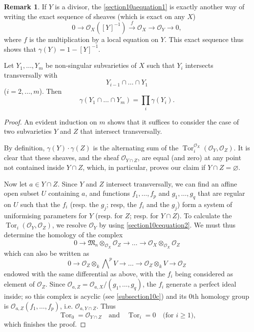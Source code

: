 \documentclass{article}
\theoremstyle{plain}
\newenvironment{proposition}[1]
    {\renewcommand\theinnercustomproposition{#1}\innercustomproposition}
    {\endinnercustomproposition}
\theoremstyle{definition}
\newtheorem*{remark}{Remark}
\newcommand{\sh}[1]{{\mathscr{#1}}}
\renewcommand{\geq}{\geqslant}
\DeclareMathOperator{\Tor}{Tor}
\begin{document}
\begin{remark}
  If $Y$ is a divisor, the \cref{section10aequation1} is exactly another way of writing the exact sequence of sheaves (which is exact on any $X$)
  \[
  \label{equation3}
    0 \to \sh{O}_X([Y]^{-1}) \xrightarrow{f} \sh{O}_X \to \sh{O}_Y \to 0,
    \tag{3}
  \]
  where $f$ is the multiplication by a local equation on $Y$.
  This exact sequence thus shows that $\gamma(Y)=1-[Y]^{-1}$.
\end{remark}

\begin{proposition}{11}
\label{proposition11}
  Let $Y_1,\ldots,Y_m$ be non-singular subvarieties of $X$ such that $Y_i$ intersects transversally with
  \[
    Y_{i-1} \cap\ldots\cap Y_1
  \]
  ($i=2,\ldots,m$).
  Then
  \[
    \gamma(Y_1\cap\ldots\cap Y_m) = \prod_i\gamma(Y_i).
  \]
\end{proposition}

\begin{proof}
  An evident induction on $m$ shows that it suffices to consider the case of two subvarieties $Y$ and $Z$ that intersect transversally.

  By definition, $\gamma(Y)\cdot\gamma(Z)$ is the alternating sum of the $\Tor_i^{\sh{O}_X}(\sh{O}_Y,\sh{O}_Z)$.
  It is clear that these sheaves, and the sheaf $\sh{O}_{Y\cap Z}$, are equal (and zero) at any point not contained inside $Y\cap Z$, which, in particular, proves our claim if $Y\cap Z=\varnothing$.

  Now let $a\in Y\cap Z$.
  Since $Y$ and $Z$ intersect transversally, we can find an affine open subset $U$ containing $a$, and functions $f_1,\ldots,f_p$ and $g_1,\ldots,g_q$ that are regular on $U$ such that the $f_i$ (resp. the $g_j$; resp, the $f_i$ and the $g_j$) form a system of uniformising parameters for $Y$ (resp. for $Z$; resp. for $Y\cap Z$).
  To calculate the $\Tor_i(\sh{O}_Y,\sh{O}_Z)$, we resolve $\sh{O}_Y$ by using \cref{section10cequation2}.
  We must thus determine the homology of the complex
  \[
    0 \to \mathfrak{M}_n\otimes_{\sh{O}_X}\sh{O}_Z \to \ldots \to \sh{O}_X\otimes_{\sh{O}_X}\sh{O}_Z
  \]
  which can also be written as
  \[
    0 \to \sh{O}_Z\otimes_k\bigwedge\nolimits^p V \to \ldots \to \sh{O}_Z\otimes_k V \to \sh{O}_Z
  \]
  endowed with the same differential as above, with the $f_i$ being considered as element of $\sh{O}_Z$.
  Since $\sh{O}_{a,Z} = \sh{O}_{a,X}/(g_1,\ldots,g_q)$, the $f_i$ generate a perfect ideal inside;
  so this complex is acyclic (see \cref{subsection10c}) and its $0$th homology group is $\sh{O}_{a,Z}(f_1,\ldots,f_p)$, i.e. $\sh{O}_{a,Y\cap Z}$.
  Thus
  \[
    \Tor_0 = \sh{O}_{Y\cap Z}
    \quad\text{and}\quad
    \Tor_i = 0
    \quad\mbox{(for $i\geq1$),}
  \]
  which finishes the proof.
\end{proof}
\end{document}
